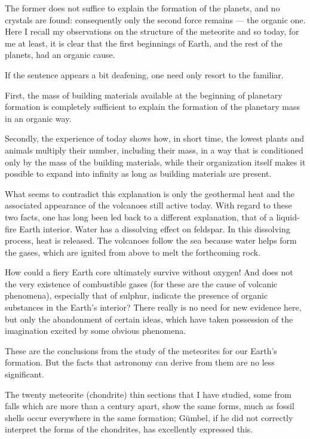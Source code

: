 \documentclass[a4paper, 12pt, oneside]{article}
\begin{document}
The former does not suffice to explain the formation of the planets, and no crystals are found: consequently only the second force remains --- the organic one. Here I recall my observations on the structure of the meteorite and so today, for me at least, it is clear that the first beginnings of Earth, and the rest of the planets, had an organic cause.

If the sentence appears a bit deafening, one need only resort to the familiar.

First, the mass of building materials available at the beginning of planetary formation is completely sufficient to explain the formation of the planetary mass in an organic way.

Secondly, the experience of today shows how, in short time, the lowest plants and animals multiply their number, including their mass, in a way that is conditioned only by the mass of the building materials, while their organization itself makes it possible to expand into infinity as long as building materials are present.

What seems to contradict this explanation is only the geothermal heat and the associated appearance of the volcanoes still active today. With regard to these two facts, one has long been led back to a different explanation, that of a liquid-fire Earth interior. Water has a dissolving effect on feldspar. In this dissolving process, heat is released. The volcanoes follow the sea because water helps form the gases, which are ignited from above to melt the forthcoming rock.

How could a fiery Earth core ultimately survive without oxygen! And does not the very existence of combustible gases (for these are the cause of volcanic phenomena), especially that of sulphur, indicate the presence of organic substances in the Earth's interior? There really is no need for new evidence here, but only the abandonment of certain ideas, which have taken possession of the imagination excited by some obvious phenomena.

These are the conclusions from the study of the meteorites for our Earth's formation. But the facts that astronomy can derive from them are no less significant.

The twenty meteorite (chondrite) thin sections that I have studied, some from falls which are more than a century apart, show the same forms, much as fossil shells occur everywhere in the same formation; Gümbel, if he did not correctly interpret the forms of the chondrites, has excellently expressed this.
\end{document}
